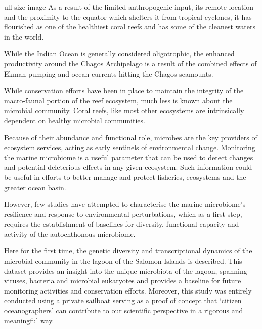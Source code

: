 ull size image
As a result of the limited anthropogenic input, its remote location and the proximity to the equator which shelters it from tropical cyclones, it has flourished as one of the healthiest coral reefs and has some of the cleanest waters in the world. \cite{sheppard2012reefs, riegl_human_2012}

While the Indian Ocean is generally considered oligotrophic, the enhanced productivity around the Chagos Archipelago \cite{sheppard1999ecology} is a result of the combined effects of Ekman pumping \cite{sheppard2012reefs, resplandy2009seasonal} and ocean currents hitting the Chagos seamounts. \cite{sheppard1999ecology, mendonca_is_2012}

While conservation efforts have been in place to maintain the integrity of the macro-faunal portion of the reef ecosystem, much less is known about the microbial community. Coral reefs, like most other ecosystems are intrinsically dependent on healthy microbial communities. \cite{dinsdale_microbial_2008, rosenberg_role_2007}

Because of their abundance and functional role, microbes are the key providers of ecosystem services, acting as early sentinels of environmental change. Monitoring the marine microbiome is a useful parameter that can be used to detect changes and potential deleterious effects in any given ecosystem. Such information could be useful in efforts to better manage and protect fisheries, ecosystems and the greater ocean basin.

However, few studies have attempted to characterise the marine microbiome's resilience and response to environmental perturbations, which as a first step, requires the establishment of baselines for diversity, functional capacity and activity of the autochthonous microbiome.

Here for the first time, the genetic diversity and transcriptional dynamics of the microbial community in the lagoon of the Salomon Islands is described. This dataset provides an insight into the unique microbiota of the lagoon, spanning viruses, bacteria and microbial eukaryotes and provides a baseline for future monitoring activities and conservation efforts. Moreover, this study was entirely conducted using a private sailboat serving as a proof of concept that `citizen oceanographers' can contribute to our scientific perspective in a rigorous and meaningful way. \cite{lauro_common_2014}